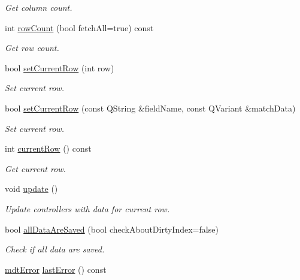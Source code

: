 \begin{DoxyCompactItemize}
\begin{DoxyCompactList}\small\item\em Get column count. \end{DoxyCompactList}\item 
int \hyperlink{classmdt_abstract_sql_table_controller_a91b9d8a7e7ab41e142baf9ba149c428e}{row\-Count} (bool fetch\-All=true) const 
\begin{DoxyCompactList}\small\item\em Get row count. \end{DoxyCompactList}\item 
bool \hyperlink{classmdt_abstract_sql_table_controller_a305a1a31db83f0f49f4a4166c4d1cad1}{set\-Current\-Row} (int row)
\begin{DoxyCompactList}\small\item\em Set current row. \end{DoxyCompactList}\item 
bool \hyperlink{classmdt_abstract_sql_table_controller_a496e148f79e951c42bb13230ea49ccd1}{set\-Current\-Row} (const Q\-String \&field\-Name, const Q\-Variant \&match\-Data)
\begin{DoxyCompactList}\small\item\em Set current row. \end{DoxyCompactList}\item 
int \hyperlink{classmdt_abstract_sql_table_controller_a111a56537a1ed200e631e1efcd4a2244}{current\-Row} () const 
\begin{DoxyCompactList}\small\item\em Get current row. \end{DoxyCompactList}\item 
void \hyperlink{classmdt_abstract_sql_table_controller_a402c074ee50e4c35f763391e11475ea2}{update} ()
\begin{DoxyCompactList}\small\item\em Update controllers with data for current row. \end{DoxyCompactList}\item 
bool \hyperlink{classmdt_abstract_sql_table_controller_aabbf1bff271014d55a8d6e9391c691a6}{all\-Data\-Are\-Saved} (bool check\-About\-Dirty\-Index=false)
\begin{DoxyCompactList}\small\item\em Check if all data are saved. \end{DoxyCompactList}\item 
\hyperlink{classmdt_error}{mdt\-Error} \hyperlink{classmdt_abstract_sql_table_controller_a085ff6b261917b19b130e30123a166ad}{last\-Error} () const 

\end{DoxyCompactItemize}

